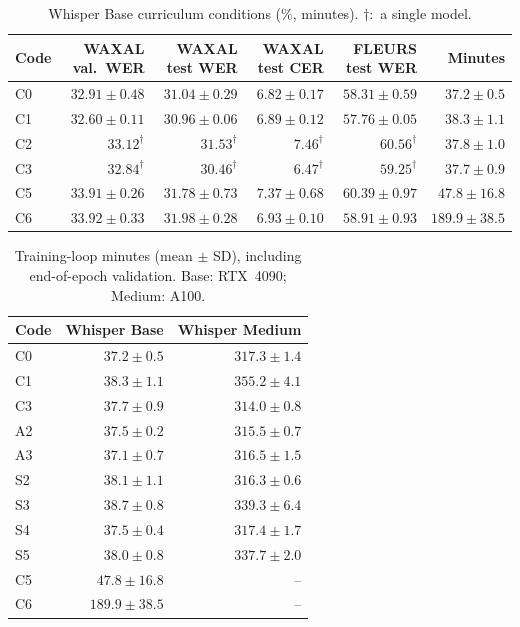 \documentclass[12pt,a4paper]{report}
\begin{document}
\begin{table}[htbp]\centering\small
\caption{Whisper Base curriculum conditions (\%, minutes). $\dagger$:~a single
model.}
\label{tab:base-curricula}
\begin{tabular}{lrrrrr}\toprule
Code & WAXAL val.\ WER & WAXAL test WER & WAXAL test CER & FLEURS test WER & Minutes\\\midrule
C0 & $32.91 \pm 0.48$ & $31.04 \pm 0.29$ & $6.82 \pm 0.17$ & $58.31 \pm 0.59$ & $37.2 \pm 0.5$ \\
C1 & $32.60 \pm 0.11$ & $30.96 \pm 0.06$ & $6.89 \pm 0.12$ & $57.76 \pm 0.05$ & $38.3 \pm 1.1$ \\
C2 & $33.12^{\dagger}$ & $31.53^{\dagger}$ & $7.46^{\dagger}$ & $60.56^{\dagger}$ & $37.8 \pm 1.0$ \\
C3 & $32.84^{\dagger}$ & $30.46^{\dagger}$ & $6.47^{\dagger}$ & $59.25^{\dagger}$ & $37.7 \pm 0.9$ \\
C5 & $33.91 \pm 0.26$ & $31.78 \pm 0.73$ & $7.37 \pm 0.68$ & $60.39 \pm 0.97$ & $47.8 \pm 16.8$ \\
C6 & $33.92 \pm 0.33$ & $31.98 \pm 0.28$ & $6.93 \pm 0.10$ & $58.91 \pm 0.93$ & $189.9 \pm 38.5$ \\
\bottomrule\end{tabular}
\end{table}

\begin{table}[htbp]\centering\small
\caption{Training-loop minutes (mean $\pm$ SD), including end-of-epoch
validation. Base: RTX~4090; Medium: A100.}
\label{tab:time}
\begin{tabular}{lrr}\toprule
Code & Whisper Base & Whisper Medium\\\midrule
C0 & $37.2 \pm 0.5$ & $317.3 \pm 1.4$ \\
C1 & $38.3 \pm 1.1$ & $355.2 \pm 4.1$ \\
C3 & $37.7 \pm 0.9$ & $314.0 \pm 0.8$ \\
A2 & $37.5 \pm 0.2$ & $315.5 \pm 0.7$ \\
A3 & $37.1 \pm 0.7$ & $316.5 \pm 1.5$ \\
S2 & $38.1 \pm 1.1$ & $316.3 \pm 0.6$ \\
S3 & $38.7 \pm 0.8$ & $339.3 \pm 6.4$ \\
S4 & $37.5 \pm 0.4$ & $317.4 \pm 1.7$ \\
S5 & $38.0 \pm 0.8$ & $337.7 \pm 2.0$ \\
C5 & $47.8 \pm 16.8$ & -- \\
C6 & $189.9 \pm 38.5$ & -- \\
\bottomrule\end{tabular}
\end{table}
\end{document}
